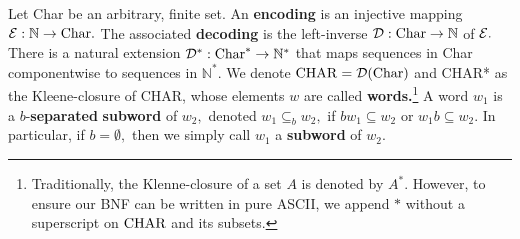 Let Char be an arbitrary, finite set. An \textbf{encoding} is an injective mapping $\mathcal{E} : \mathbb{N} \to \textrm{Char}.$ The associated \textbf{decoding} is the left-inverse $\mathcal{D}: \mathrm{Char} \to \mathbb{N}$ of $\mathcal{E}.$ There is a natural extension $\mathcal{D}^{*}: \textrm{Char}^{*} \to \mathbb{N}^{*}$
that maps sequences in Char componentwise to sequences in $\mathbb{N}^{*}.$
We denote $\mathrm{CHAR} = \mathcal{D}(\textrm{Char})$ and CHAR* as the
Kleene-closure of CHAR, whose elements $w$ are called \textbf{words.}\footnote{Traditionally, the Klenne-closure of a set $A$ is denoted by $A^{*}.$ However, to ensure our BNF
  can be written in pure ASCII, we append $*$ without a superscript on $\mathrm{CHAR}$ and its subsets.} A word $w_{1}$ is a $b$-\textbf{separated} \textbf{subword} of $w_{2},$ denoted $w_{1} \subseteq_{b} w_{2},$ if $bw_{1} \subseteq w_{2}$ or $w_{1}b \subseteq w_{2}.$ In particular, if $b = \emptyset,$ then we simply call $w_{1}$ a \textbf{subword} of $w_{2}.$

